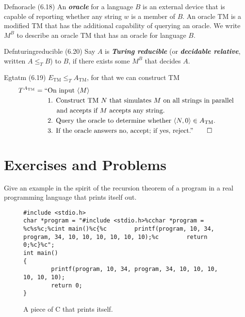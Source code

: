 \begin{reference}{Defn}{oracle}
  (6.18) An \textbf{\textit{oracle}} for a language $B$ is an external device that is capable of reporting whether any string $w$ is a member of $B$. An oracle TM is a modified TM that has the additional capability of querying an oracle. We write $M^B$ to describe an oracle TM that has an oracle for language $B$.
\end{reference}

\begin{reference}{Defn}{turingreducible}
  (6.20) Say $A$ is \textbf{\textit{Turing reducible}} (or \textbf{\textit{decidable relative}}, written $A\leq_T B$) to $B$, if there exists some $M^B$ that decides $A$.
\end{reference}

\begin{reference}{Eg}{tatm}
  (6.19) $E_{\mathrm{TM}}\leq_T A_{\mathrm{TM}}$, for that we can construct TM
  \begin{align*}
    T^{A_{\mathrm{TM}}}=\text{``} & \text{On input }\langle M\rangle                                                       \\
                                  & \text{1. Construct TM }N\text{ that simulates }M\text{ on all strings in parallel}     \\
                                  & \quad\text{ and accepts if }M\text{ accepts any string.}                               \\
                                  & \text{2. Query the oracle to determine whether }\langle N,0\rangle\in A_{\mathrm{TM}}. \\
                                  & \text{3. If the oracle answers no, accept; if yes, reject.''}\qedhere
  \end{align*}
\end{reference}

\section*{Exercises and Problems}

\begin{exercise}{6.1}
  Give an example in the spirit of the recursion theorem of a program in a real programming language that prints itself out.
\end{exercise}

\begin{figure}[H]
  \begin{lstlisting}
#include <stdio.h>
char *program = "#include <stdio.h>%cchar *program = %c%s%c;%cint main()%c{%c        printf(program, 10, 34, program, 34, 10, 10, 10, 10, 10, 10);%c        return 0;%c}%c";
int main()
{
        printf(program, 10, 34, program, 34, 10, 10, 10, 10, 10, 10);
        return 0;
}
\end{lstlisting}
  \caption{A piece of C that prints itself.}
\end{figure}

